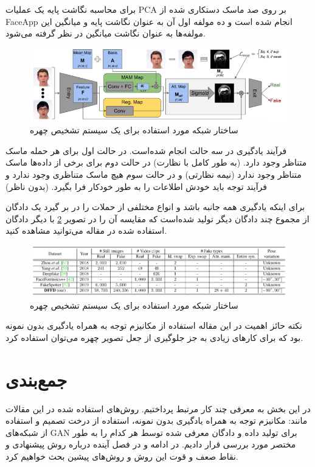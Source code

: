 برای  محاسبه نگاشت پایه یک عملیات PCA بر روی صد ماسک دستکاری شده از FaceApp انجام شده است و ده مولفه اول آن به عنوان نگاشت پایه و میانگین این مولفه‌ها به عنوان نگاشت میانگین در نظر گرفته می‌شود.
 \begin{figure}[h]
 	\centering
 	\includegraphics[width=1\textwidth]{img/report/Attention_face_anti_spoofing}
 	\caption{ساختار شبکه مورد استفاده برای یک سیستم تشخیص چهره\cite{Dang2019}}
 	\label{fig:Attention_face_anti_spoofing}
 	\centering
 \end{figure}
 
فرآیند یادگیری در سه حالت انجام شده‌است. در حالت اول برای هر حمله ماسک متناظر وجود دارد. (به طور کامل با نظارت) در حالت دوم برای برخی از داده‌ها ماسک متناظر وجود ندارد (نیمه نظارتی) و در حالت سوم هیچ ماسک متناظری وجود ندارد و فرآیند توجه باید خودش اطلاعات را به طور خودکار فرا بگیرد. (بدون ناظر)

برای اینکه یادگیری همه‌ جانبه باشد و انواع مختلفی از حملات را در بر گیرد یک دادگان از مجموع چند دادگان دیگر تولید شده‌است که مقایسه آن را در تصویر 
\ref{fig:Attention_face_anti_spoofing_dataset}
با دیگر دادگان استفاده شده در مقاله می‌توانید مشاهده کنید. 
 \begin{figure}[h]
	\centering
	\includegraphics[width=1\textwidth]{img/report/Attention_face_anti_spoofing_dataset}
	\caption{ساختار شبکه مورد استفاده برای یک سیستم تشخیص چهره\cite{Dang2019}}
	\label{fig:Attention_face_anti_spoofing_dataset}
	\centering
\end{figure}

نکته حائز اهمیت در این مقاله استفاده از مکانیزم توجه به همراه یادگیری بدون نمونه بود که برای کار‌های زیادی به جز جلوگیری از جعل تصویر چهره می‌توان استفاده کرد. 

\section{جمع‌بندی}\label{sec:3جمع‌بندی}
در این بخش به معرفی چند کار مرتبط پرداختیم. روش‌های استفاده شده در این مقالات مانند: مکانیزم توجه به همراه یادگیری بدون نمونه، استفاده از درخت تصمیم و استفاده از شبکه‌های GAN برای تولید داده و دادگان معرفی شده توسط هر کدام را به طور مختصر مورد بررسی قرار دادیم. در ادامه و در فصل آینده درباره روش پیشنهادی و نقاط صعف و قوت این روش و روش‌های پیشین بحث خواهیم کرد.














